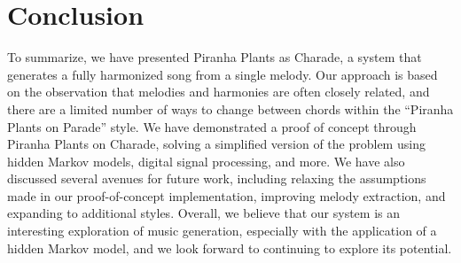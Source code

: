 \section{Conclusion}

To summarize, we have presented Piranha Plants as Charade, a system that generates a fully harmonized song from a single melody. Our approach is based on the observation that melodies and harmonies are often closely related, and there are a limited number of ways to change between chords within the ``Piranha Plants on Parade'' style. We have demonstrated a proof of concept through Piranha Plants on Charade, solving a simplified version of the problem using hidden Markov models, digital signal processing, and more. We have also discussed several avenues for future work, including relaxing the assumptions made in our proof-of-concept implementation, improving melody extraction, and expanding to additional styles. Overall, we believe that our system is an interesting exploration of music generation, especially with the application of a hidden Markov model, and we look forward to continuing to explore its potential.
